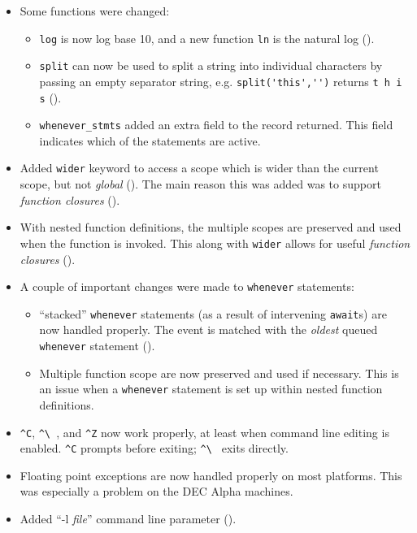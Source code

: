 \begin{itemize}
\item Some functions were changed:
\begin{itemize}
\item \texttt{log} is now log base 10, and a new function \texttt{ln} is
the natural log ().
\item \texttt{split} can now be used to split a string into individual
characters by passing an empty separator string, e.g. \verb+split('this','')+
returns \verb+t h i s+ ().
\item \texttt{whenever\_stmts} added an extra field to the record returned. This
field indicates which of the statements are active.
\end{itemize}

\item Added \texttt{wider} keyword to access a scope which is wider than the 
current scope, but not \emph{global} (). The main reason this was
added was to support \emph{function closures} ().

\item With nested function definitions, the multiple scopes are preserved and
used when the function is invoked. This along with \texttt{wider} allows for
useful \emph{function closures} ().

\item A couple of important changes were made to \texttt{whenever} statements:
\begin{itemize}
\item ``stacked'' \texttt{whenever} statements (as a result of intervening
\texttt{await}s) are now handled properly. The event is matched with the
\emph{oldest} queued \texttt{whenever} statement ().
\item Multiple function scope are now preserved and used if necessary. This
is an issue when a \texttt{whenever} statement is set up within nested function
definitions.
\end{itemize}

\item \verb+^C+, \verb+^\ +, and \verb+^Z+ now work properly, at least when
command line editing is enabled. \verb+^C+ prompts before exiting; \verb+^\ +
exits directly.

\item Floating point exceptions are now handled properly on most platforms.
This was especially a problem on the DEC Alpha machines.

\item Added ``-l \emph{file}'' command line parameter ().


\end{itemize}
